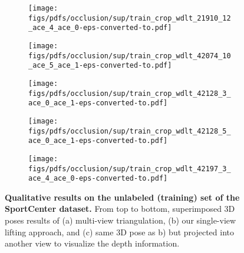 \documentclass[runningheads]{llncs}
\begin{document}
\begin{figure*}[t!]
\begin{subfigure}[b]{0.16\linewidth}
    \end{subfigure}
    \begin{subfigure}[b]{0.16\linewidth}        \centering
        \texttt{[image: figs/pdfs/occlusion/sup/train\_crop\_wdlt\_21910\_12\_ace\_4\_ace\_0-eps-converted-to.pdf]}
    \end{subfigure}
    \begin{subfigure}[b]{0.16\linewidth}        \centering
        \texttt{[image: figs/pdfs/occlusion/sup/train\_crop\_wdlt\_42074\_10\_ace\_5\_ace\_1-eps-converted-to.pdf]}
    \end{subfigure}
    \begin{subfigure}[b]{0.16\linewidth}        \centering
        \texttt{[image: figs/pdfs/occlusion/sup/train\_crop\_wdlt\_42128\_3\_ace\_0\_ace\_1-eps-converted-to.pdf]}
    \end{subfigure}
    \begin{subfigure}[b]{0.16\linewidth}        \centering
        \texttt{[image: figs/pdfs/occlusion/sup/train\_crop\_wdlt\_42128\_5\_ace\_0\_ace\_1-eps-converted-to.pdf]}
    \end{subfigure}
    \begin{subfigure}[b]{0.16\linewidth}        \centering
        \texttt{[image: figs/pdfs/occlusion/sup/train\_crop\_wdlt\_42197\_3\_ace\_4\_ace\_0-eps-converted-to.pdf]}
    \end{subfigure}
    
            
    \caption{\small \textbf{Qualitative results on the unlabeled (training) set of the SportCenter dataset.} From top to bottom, superimposed 3D poses results of (a) multi-view triangulation, (b) our single-view lifting approach, and (c) same 3D pose as b) but projected into another view to visualize the depth information.}
    \label{fig:visuals_sc_sup_train}
\end{figure*}  
\end{document}

